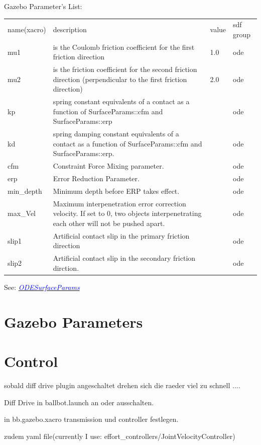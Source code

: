 \documentclass[twoside,colorback,accentcolor=tud4c,11pt]{tudreport}
\newcommand{\mylink}[2] {	\hyperlink{#1}{	\textit{\textcolor{blue}{#2}}}}
\begin{document}
Gazebo Parameter's List:\\
\begin{tabular}{l L{12cm} l l}
	name(xacro)&description&value&sdf group\\
	mu1&is the Coulomb friction coefficient for the first friction direction&1.0&ode\\
	mu2& is the friction coefficient for the second friction direction (perpendicular to the first friction direction)&2.0&ode\\
	kp&spring constant equivalents of a contact as a function of SurfaceParams::cfm and SurfaceParams::erp & &ode \\
	kd&spring damping constant equivalents of a contact as a function of SurfaceParams::cfm and SurfaceParams::erp.   & &ode \\
	cfm&Constraint Force Mixing parameter.& &ode \\
	erp&Error Reduction Parameter.& &ode \\
	min\_depth&Minimum depth before ERP takes effect.   & &ode \\
	max\_Vel& Maximum interpenetration error correction velocity.
	If set to 0, two objects interpenetrating each other will not be pushed apart.  & &ode \\
	slip1&Artificial contact slip in the primary friction direction  & &ode \\
	slip2&Artificial contact slip in the secondary friction dirction.& &ode \\
\end{tabular}

See: \mylink{http://osrf-distributions.s3.amazonaws.com/gazebo/api/dev/classgazebo_1_1physics_1_1ODESurfaceParams.html}{ODESurfaceParams}

\section{Gazebo Parameters}

	
	\section{Control}
	sobald diff drive plugin angeschaltet drehen sich die raeder viel zu schnell ....
	
	Diff Drive in ballbot.launch an oder ausschalten. 
	
	in bb.gazebo.xacro transmission und controller festlegen.
	
	zudem yaml file(currently I use: effort\_controllers/JointVelocityController)
	
\end{document}
